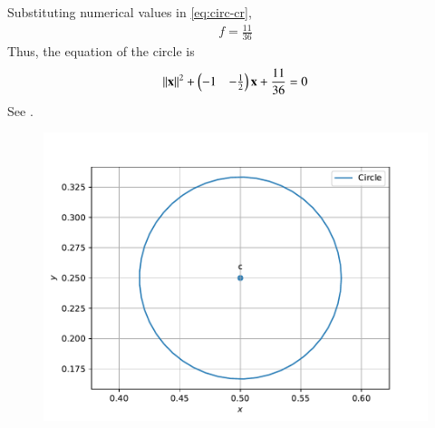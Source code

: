 Substituting numerical values
	in \eqref{eq:circ-cr},
\begin{align}
	f
	=\frac{11}{36}
\end{align}
	Thus, the equation of the circle is
\begin{align}
	\left\lVert\mathbf{x}\right\rVert^2 + \begin{pmatrix}-1 & -\frac{1}{2}\end{pmatrix}\mathbf{x}+\frac{11}{36}=0
\end{align}
See .
\begin{figure}[!ht]
\begin{center}
\includegraphics[width=\columnwidth]{chapters/11/11/1/3/figs/fig.pdf}
\end{center}
\caption{}
\label{fig:chapters/11/11/1/3/Fig1}
\end{figure}
